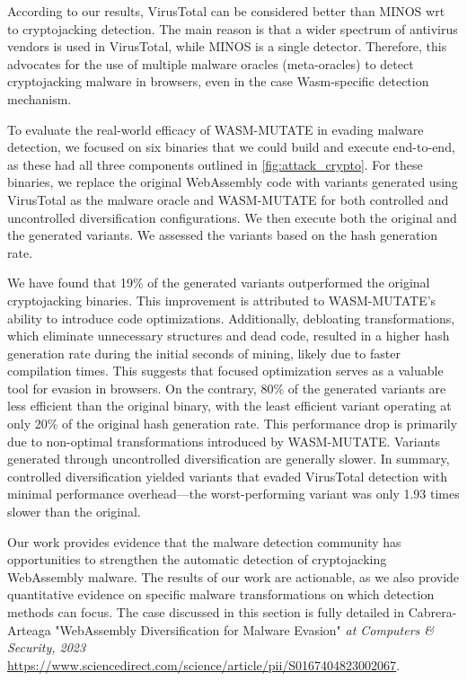 \begin{tcolorbox}[title=Takeaway,boxrule=1pt,arc=.2em,boxsep=1.0mm]
    According to our results, VirusTotal can be considered better than MINOS wrt to cryptojacking detection. 
    The main reason is that a wider spectrum of antivirus vendors is used in VirusTotal, while MINOS is a single detector.
    Therefore, this advocates for the use of multiple malware oracles (meta-oracles) to detect cryptojacking malware in browsers, even in the case Wasm-specific detection mechanism.
\end{tcolorbox}





 To evaluate the real-world efficacy of WASM-MUTATE in evading malware detection, we focused on six binaries that we could build and execute end-to-end, as these had all three components outlined in \autoref{fig:attack_crypto}. 
For these binaries, we replace the original WebAssembly code with variants generated using VirusTotal as the malware oracle and WASM-MUTATE for both controlled and uncontrolled diversification configurations. 
We then execute both the original and the generated variants. 
We assessed the variants based on the hash generation rate.

We have found that 19\% of the generated variants outperformed the original cryptojacking binaries. 
This improvement is attributed to WASM-MUTATE's ability to introduce code optimizations. 
Additionally, debloating transformations, which eliminate unnecessary structures and dead code, resulted in a higher hash generation rate during the initial seconds of mining, likely due to faster compilation times. 
This suggests that focused optimization serves as a valuable tool for evasion in browsers.
On the contrary, 80\% of the generated variants are less efficient than the original binary, with the least efficient variant operating at only 20\% of the original hash generation rate. 
This performance drop is primarily due to non-optimal transformations introduced by WASM-MUTATE. 
Variants generated through uncontrolled diversification are generally slower.
In summary, controlled diversification yielded variants that evaded VirusTotal detection with minimal performance overhead—the worst-performing variant was only 1.93 times slower than the original.


\begin{tcolorbox}[title=Contribution paper,boxrule=1pt,arc=.2em,boxsep=1.0mm]
    Our work provides evidence that the malware detection community has opportunities to strengthen the automatic detection of cryptojacking WebAssembly malware. 
    The results of our work are actionable, as we also provide quantitative evidence on specific malware transformations on which detection methods can focus. 
    The case discussed in this section is fully detailed in Cabrera-Arteaga \etal "WebAssembly Diversification for Malware Evasion"
    \emph{at Computers \& Security, 2023}
    \url{https://www.sciencedirect.com/science/article/pii/S0167404823002067}. 
\end{tcolorbox}
